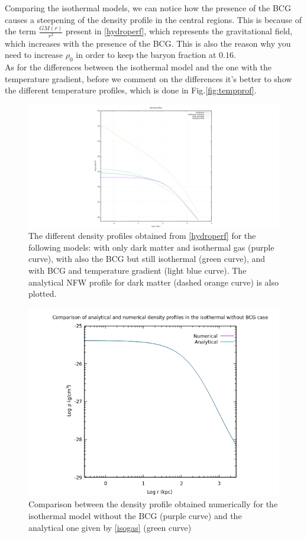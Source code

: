 \documentclass{article}
\begin{document}
Comparing the isothermal models, we can notice how the presence of the BCG causes a steepening of the density profile in the
central regions. This is because of the term $\frac{GM(r)}{r^{2}}$ present in \eqref{hydroperf}, which represents the gravitational field, which increases with the presence of the BCG.
This is also the reason why you need to increase $\rho_{0}$ in order to keep the baryon fraction at $0.16$.\\
As for the differences between the isothermal model and the one with the temperature gradient, before we comment on the differences it's better to show the different temperature profiles, which is done in Fig.\ref{fig:tempprof}.
\begin{figure}[H]
	\centering
	\includegraphics[width=\textwidth]{density_profiles.png}
	\caption{The different density profiles obtained from \eqref{hydroperf} for the following models: with only dark matter and isothermal gas (purple curve), with also the BCG but still isothermal (green curve), and with BCG and temperature gradient (light blue curve). 
	The analytical NFW profile for dark matter (dashed orange curve) is also plotted.}
	\label{fig:densityprofiles}
\end{figure}
\begin{figure}[H]
	\includegraphics[width=\textwidth]{rhoiso.png}
	\caption{Comparison between the density profile obtained numerically for the isothermal model without the BCG (purple curve) and the analytical one given by \eqref{isogas} (green curve)}
	\label{fig:analvsnum}
\end{figure}
\end{document}
